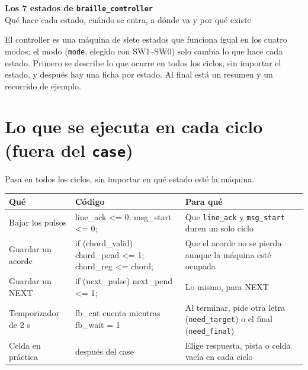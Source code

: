 \documentclass[11pt,a4paper]{article}
\newcommand{\cod}[1]{\texttt{#1}}
\begin{document}
\begin{center}
{\color{tinta}\LARGE\bfseries Los 7 estados de \texttt{braille\_controller}}\\[4pt]
{\color{gris}Qué hace cada estado, cuándo se entra, a dónde va y por qué existe}
\end{center}
\vspace{4pt}

\begin{idea}
El controller es una máquina de siete estados que funciona igual en los cuatro modos;
el modo (\cod{mode}, elegido con SW1--SW0) solo cambia lo que hace cada estado. Primero
se describe lo que ocurre en todos los ciclos, sin importar el estado, y después hay una
ficha por estado. Al final está un resumen y un recorrido de ejemplo.
\end{idea}

\section*{Lo que se ejecuta en cada ciclo (fuera del \texttt{case})}
\noindent Pasa en todos los ciclos, sin importar en qué estado esté la máquina.

\medskip
\noindent{}
\begin{tabularx}{\linewidth}{>{\raggedright}p{3.2cm} >{\ttfamily\raggedright}p{5.8cm} L}
\toprule
{}\textbf{Qué} & \normalfont\textbf{Código} & \textbf{Para qué} \\
\midrule
Bajar los pulsos & line\_ack <= 0; msg\_start <= 0; & Que \cod{line\_ack} y \cod{msg\_start} duren un solo ciclo \\
Guardar un acorde & if (chord\_valid) chord\_pend <= 1; chord\_reg <= chord; & Que el acorde no se pierda aunque la máquina esté ocupada \\
Guardar un NEXT & if (next\_pulse) next\_pend <= 1; & Lo mismo, para NEXT \\
Temporizador de 2 s & fb\_cnt cuenta mientras fb\_wait = 1 & Al terminar, pide otra letra (\cod{need\_target}) o el final (\cod{need\_final}) \\
Celda en práctica & después del case & Elige respuesta, pista o celda vacía en cada ciclo \\
\bottomrule
\end{tabularx}

\end{document}
